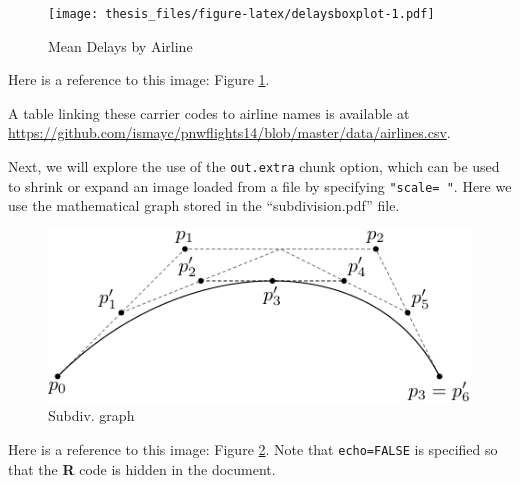 \documentclass[12pt,twoside]{reedthesis}
\theoremstyle{definition}
\theoremstyle{definition}
\theoremstyle{remark}
\begin{document}
  \begin{Shaded}
  \end{Shaded}
  
  \begin{figure}[htbp]
  \centering
  \texttt{[image: thesis\_files/figure-latex/delaysboxplot-1.pdf]}
  \caption{\label{fig:delaysboxplot}Mean Delays by Airline}
  \end{figure}
  
  Here is a reference to this image: Figure \ref{fig:delaysboxplot}.
  
  A table linking these carrier codes to airline names is available at
  \url{https://github.com/ismayc/pnwflights14/blob/master/data/airlines.csv}.
  
  \clearpage
  
  Next, we will explore the use of the \texttt{out.extra} chunk option,
  which can be used to shrink or expand an image loaded from a file by
  specifying \texttt{"scale=\ "}. Here we use the mathematical graph
  stored in the ``subdivision.pdf'' file.
  
  \begin{figure}
  \includegraphics[scale=0.75]{figure/subdivision} \caption{Subdiv. graph}\label{fig:subd}
  \end{figure}
  
  Here is a reference to this image: Figure \ref{fig:subd}. Note that
  \texttt{echo=FALSE} is specified so that the \textbf{R} code is hidden
  in the document.
  
\end{document}
